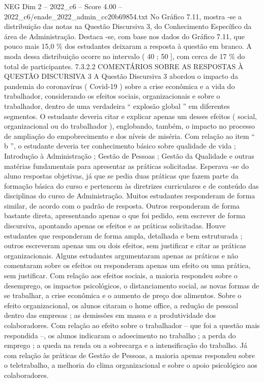 \begin{textsample}{NEG Dim 2 – 2022\_c6 – Score 4.00 – 2022\_c6/enade\_2022\_admin\_cc20b69854.txt}
No Gráfico 7.11, mostra -se a distribuição das notas na Questão Discursiva 3, do Conhecimento Específico da área de Administração.
Destaca -se, com base nos dados do Gráfico 7.11, que pouco mais 15,0 \% dos estudantes deixaram a resposta à questão em branco.
A moda dessa distribuição ocorre no intervalo ( 40 ; 50 ], com cerca de 17 \% do total de participantes. 7.3.2.2 COMENTÁRIOS SOBRE AS RESPOSTAS À QUESTÃO DISCURSIVA 3 A Questão Discursiva 3 abordou o impacto da pandemia do coronavírus ( Covid-19 ) sobre a crise econômica e a vida do trabalhador, considerando os efeitos sociais, organizacionais e sobre o trabalhador, dentro de uma verdadeira “ explosão global ” em diferentes segmentos.
O estudante deveria citar e explicar apenas um desses efeitos ( social, organizacional ou do trabalhador ), englobando, também, o impacto no processo de ampliação do empobrecimento e dos níveis de miséria.
Com relação ao item “ b ”, o estudante deveria ter conhecimento básico sobre qualidade de vida ; Introdução à Administração ; Gestão de Pessoas ; Gestão da Qualidade e outras matérias fundamentais para apresentar as práticas solicitadas.
Esperava -se do aluno respostas objetivas, já que se pedia duas práticas que fazem parte da formação básica do curso e pertencem às diretrizes curriculares e de conteúdo das disciplinas do curso de Administração.
Muitos estudantes responderam de forma similar, de acordo com o padrão de resposta.
Outros responderam de forma bastante direta, apresentando apenas o que foi pedido, sem escrever de forma discursiva, apontando apenas os efeitos e as práticas solicitadas.
Houve estudantes que responderam de forma ampla, detalhada e bem estruturada ; outros escreveram apenas um ou dois efeitos, sem justificar e citar as práticas organizacionais.
Alguns estudantes argumentaram apenas as práticas e não comentaram sobre os efeitos ou responderam apenas um efeito ou uma prática, sem justificar.
Com relação aos efeitos sociais, a maioria respondeu sobre o desemprego, os impactos psicológicos, o distanciamento social, as novas formas de se trabalhar, a crise econômica e o aumento de preço dos alimentos.
Sobre o efeito organizacional, os alunos citaram o home office, a redução de pessoal dentro das empresas ; as demissões em massa e a produtividade dos colaboradores.
Com relação ao efeito sobre o trabalhador – que foi a questão mais respondida –, os alunos indicaram o adoecimento no trabalho ; a perda do emprego ; a queda na renda ou a sobrecarga e a intensificação do trabalho.
Já com relação às práticas de Gestão de Pessoas, a maioria apenas respondeu sobre o teletrabalho, a melhoria do clima organizacional e sobre o apoio psicológico aos colaboradores.

\end{textsample}
